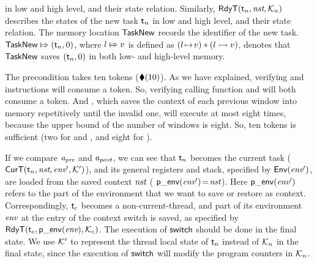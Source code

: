 in low and high level, and their state relation. 
Similarly, $\textsf{RdyT}({\textsf{t}_n}, {\textit{nst}}, {\mathcal{K}_n})$
describes the states of the new task $\textsf{t}_n$ in low and high level,
and their state relation.
The memory location
$\mathsf{TaskNew}$ records the identifier of the new task.
${\mathsf{TaskNew}}\Mapsto{(\textsf{t}_n, 0)}$, where ${l}\Mapsto{v}$ 
is defined as $({l} \!\mapsto\! {v}) * ({l} \rightarrowtail {v})$, 
denotes that
$\mathsf{TaskNew}$ saves $(\textsf{t}_n, 0)$
in both low- and high-level memory.

The precondition takes ten tokens ($\blacklozenge({10})$).
As we have explained, verifying \call{}
and \jmp{} instructions will consume a token.
So, verifying calling function
\regsave{} and \regrestore{} will
both consume a token. And \SaveUsedWin{},
which saves the context of each previous window
into memory repetitively until the invalid one,
will execute at most eight times,
because the upper bound of
the number of windows is eight.
So, ten tokens is sufficient (two for \regsave{} and
\regrestore{}, and eight for \SaveUsedWin{}).

If we compare $\textit{a}_\textit{pre}$ and $\textit{a}_\textit{post}$, we can see that
$\textsf{t}_n$ becomes the current task
($\textsf{CurT}({\textsf{t}_n}, {\textit{nst}}, {\textit{env}'}, {\mathcal{K}'})$),
and its general registers and stack, specified by
$\mathsf{Env}({\textit{env}'})$, are loaded from the saved context
$\textit{nst}$ (\ie{} $\mathsf{p\_env}({\textit{env}'})\!=\!\textit{nst}$).
Here $\mathsf{p\_env}({\textit{env}'})$ refers to the part of the environment
that we want to save or restore as context.
Correspondingly, $\textsf{t}_c$ becomes a non-current-thread,
and part of its environment $\textit{env}$ at the entry of
the context switch is saved, as specified by
$\textsf{RdyT}({\textsf{t}_c}, {\mathsf{p\_env}({\textit{env}})}, {\mathcal{K}_c})$.
The execution of $\mathsf{switch}$ should be done in the final state.
We use $\mathcal{K}'$ to represent the thread local
state of $\textsf{t}_n$ instead of $\mathcal{K}_n$
in the final state, since the execution of
$\mathsf{switch}$ will modify the program counters
in $\mathcal{K}_n$.

